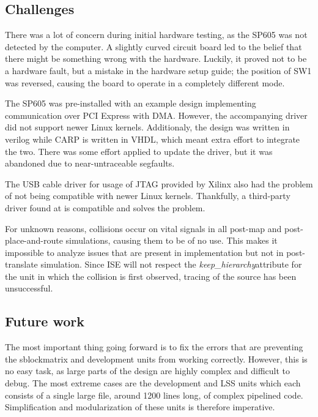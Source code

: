 \subsection{Challenges}
\label{sec:challenges}

There was a lot of concern during initial hardware testing, as the SP605 was not detected by the computer.
A slightly curved circuit board led to the belief that there might be something wrong with the hardware.
Luckily, it proved not to be a hardware fault, but a mistake in the hardware setup guide; the position of SW1 was reversed, causing the board to operate in a completely different mode.

The SP605 was pre-installed with an example design implementing communication over PCI Express with DMA.
However, the accompanying driver did not support newer Linux kernels.
Additionaly, the design was written in verilog while CARP is written in VHDL, which meant extra effort to integrate the two.
There was some effort applied to update the driver, but it was abandoned due to near-untraceable segfaults.

The USB cable driver for usage of JTAG provided by Xilinx also had the problem of not being compatible with newer Linux kernels.
Thankfully, a third-party driver found at \cite{usbdriver} is compatible and solves the problem.

For unknown reasons, collisions occur on vital signals in all post-map and post-place-and-route simulations\footnotemark, causing them to be of no use.
This makes it impossible to analyze issues that are present in implementation but not in post-translate simulation.
Since ISE will not respect the \emph{keep\_hierarchy}\footnotemark attribute for the unit in which the collision is first observed, tracing of the source has been unsuccessful.

\subsection{Future work}

The most important thing going forward is to fix the errors that are preventing the sblockmatrix and development units from working correctly.
However, this is no easy task, as large parts of the design are highly complex and difficult to debug.
The most extreme cases are the development and LSS units which each consists of a single large file, around 1200 lines long, of complex pipelined code.
Simplification and modularization of these units is therefore imperative.

